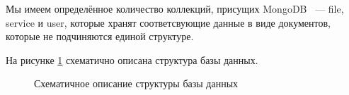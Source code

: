 Мы имеем определённое количество коллекций, присущих MongoDB ~--- file, service и user, которые хранят соответсвующие данные в виде документов, которые не подчиняются единой
структуре.

На рисунке \ref{des:bd_image} схематично описана структура базы данных.

\begin{figure}[H]
    \caption{Схематичное описание структуры базы данных}
    \label{des:bd_image}
\end{figure}
